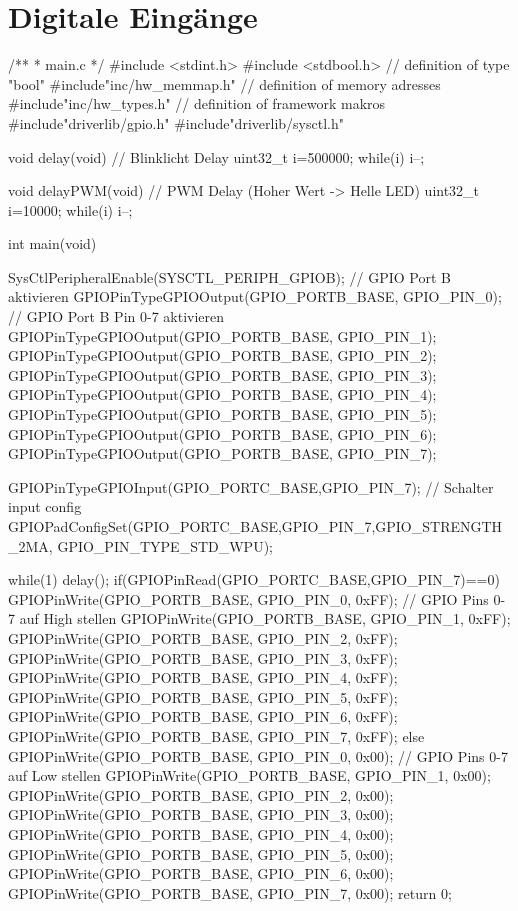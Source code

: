 \section{Digitale Eingänge}


/**
 * main.c
 */
 #include <stdint.h>
 #include <stdbool.h>                                           // definition of type "bool"
 #include"inc/hw_memmap.h"                                      // definition of memory adresses
 #include"inc/hw_types.h"                                        // definition of framework makros
 #include"driverlib/gpio.h"
 #include"driverlib/sysctl.h"

void delay(void)                                                // Blinklicht Delay
{
  uint32_t i=500000;
  while(i) {i--;}
 }

void delayPWM(void)                                             // PWM Delay (Hoher Wert -> Helle LED)
{
  uint32_t i=10000;
  while(i) {i--;}
 }


int main(void){
    SysCtlPeripheralEnable(SYSCTL_PERIPH_GPIOB);                // GPIO Port B aktivieren
    GPIOPinTypeGPIOOutput(GPIO_PORTB_BASE, GPIO_PIN_0);         // GPIO Port B Pin 0-7 aktivieren
    GPIOPinTypeGPIOOutput(GPIO_PORTB_BASE, GPIO_PIN_1);
    GPIOPinTypeGPIOOutput(GPIO_PORTB_BASE, GPIO_PIN_2);
    GPIOPinTypeGPIOOutput(GPIO_PORTB_BASE, GPIO_PIN_3);
    GPIOPinTypeGPIOOutput(GPIO_PORTB_BASE, GPIO_PIN_4);
    GPIOPinTypeGPIOOutput(GPIO_PORTB_BASE, GPIO_PIN_5);
    GPIOPinTypeGPIOOutput(GPIO_PORTB_BASE, GPIO_PIN_6);
    GPIOPinTypeGPIOOutput(GPIO_PORTB_BASE, GPIO_PIN_7);

    GPIOPinTypeGPIOInput(GPIO_PORTC_BASE,GPIO_PIN_7);           // Schalter input config
    GPIOPadConfigSet(GPIO_PORTC_BASE,GPIO_PIN_7,GPIO_STRENGTH_2MA, GPIO_PIN_TYPE_STD_WPU);

   while(1)
   {
       delay();
       if(GPIOPinRead(GPIO_PORTC_BASE,GPIO_PIN_7)==0) {
    GPIOPinWrite(GPIO_PORTB_BASE, GPIO_PIN_0, 0xFF);            // GPIO Pins 0-7 auf High stellen
    GPIOPinWrite(GPIO_PORTB_BASE, GPIO_PIN_1, 0xFF);
    GPIOPinWrite(GPIO_PORTB_BASE, GPIO_PIN_2, 0xFF);
    GPIOPinWrite(GPIO_PORTB_BASE, GPIO_PIN_3, 0xFF);
    GPIOPinWrite(GPIO_PORTB_BASE, GPIO_PIN_4, 0xFF);
    GPIOPinWrite(GPIO_PORTB_BASE, GPIO_PIN_5, 0xFF);
    GPIOPinWrite(GPIO_PORTB_BASE, GPIO_PIN_6, 0xFF);
    GPIOPinWrite(GPIO_PORTB_BASE, GPIO_PIN_7, 0xFF);
       }
       else
       {
    GPIOPinWrite(GPIO_PORTB_BASE, GPIO_PIN_0, 0x00);            // GPIO Pins 0-7 auf Low stellen
    GPIOPinWrite(GPIO_PORTB_BASE, GPIO_PIN_1, 0x00);
    GPIOPinWrite(GPIO_PORTB_BASE, GPIO_PIN_2, 0x00);
    GPIOPinWrite(GPIO_PORTB_BASE, GPIO_PIN_3, 0x00);
    GPIOPinWrite(GPIO_PORTB_BASE, GPIO_PIN_4, 0x00);
    GPIOPinWrite(GPIO_PORTB_BASE, GPIO_PIN_5, 0x00);
    GPIOPinWrite(GPIO_PORTB_BASE, GPIO_PIN_6, 0x00);
    GPIOPinWrite(GPIO_PORTB_BASE, GPIO_PIN_7, 0x00);
       }
   }
    return 0;
}

